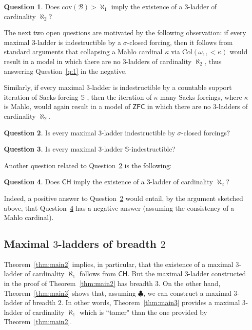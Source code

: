 \documentclass[]{amsart}
\theoremstyle{definition}
\newtheorem{question}{Question}
\theoremstyle{remark}
\begin{document}
\begin{question}
Does $\mathrm{cov}(\mathcal{B}) > \aleph_1$ imply the existence of a $3$-ladder of cardinality $\aleph_2$?
\end{question}


The next two open questions are motivated by the following observation: if every maximal $3$-ladder is indestructible by a $\sigma$-closed forcing, then it follows from standard arguments that collapsing a Mahlo cardinal $\kappa$ via $\text{Col}(\omega_1, {<}\kappa)$ would result in a model in which there are no $3$-ladders of cardinality $\aleph_2$, thus answering Question~\ref{q:1} in the negative.

Similarly, if every maximal $3$-ladder is indestructible by a countable support iteration of Sacks forcing $\mathbb{S}$ \cite{MR556894}, then the iteration of $\kappa$-many Sacks forcings, where $\kappa$ is Mahlo, would again result in a model of $\mathsf{ZFC}$ in which there are no $3$-ladders of cardinality $\aleph_2$.


\begin{question}\label{q:3}
Is every maximal $3$-ladder indestructible by $\sigma$-closed forcings?
\end{question}
\begin{question}\label{q:4}
Is every maximal $3$-ladder $\mathbb{S}$-indestructible?
\end{question}

Another question related to Question~\ref{q:3} is the following:
\begin{question}\label{q:5}
Does $\mathsf{CH}$ imply the existence of a $3$-ladder of cardinality $\aleph_2$?
\end{question}
Indeed, a positive answer to Question~\ref{q:3} would entail, by the argument sketched above, that Question~\ref{q:5} has a negative answer (assuming the consistency of a Mahlo cardinal).

\subsection{Maximal $3$-ladders of breadth $2$}
Theorem~\ref{thm:main2} implies, in particular, that the existence of a maximal $3$-ladder of cardinality $\aleph_1$ follows from $\mathsf{CH}$. But the maximal $3$-ladder constructed in the proof of Theorem~\ref{thm:main2} has breadth $3$. On the other hand, Theorem~\ref{thm:main3} shows that, assuming $\clubsuit$, we can construct a maximal $3$-ladder of breadth $2$. In other words, Theorem~\ref{thm:main3} provides a maximal $3$-ladder of cardinality $\aleph_1$ which is ``tamer" than the one provided by Theorem~\ref{thm:main2}.
\end{document}

